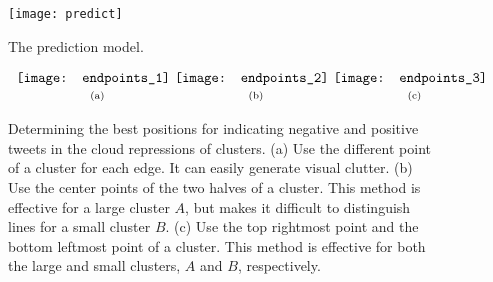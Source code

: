 
\begin{figure}[t]
\begin{center}
\texttt{[image: predict]}
\end{center}
\vspace{-.1in}
\caption{The prediction model.}
\label{fig:predict-model}
\end{figure}

\begin{figure*}[t]
\begin{center}
$\begin{array}{c@{\hspace{0.01\linewidth}}c@{\hspace{0.01\linewidth}}c}
\texttt{[image: endpoints\_1]} &
\texttt{[image: endpoints\_2]} &
\texttt{[image: endpoints\_3]}
\\
\mbox{\small{(a)}} & \mbox{\small{(b)}} & \mbox{\small{(c)}}
\end{array}$
\end{center}
\vspace{-.1in}
\caption{Determining the best positions for indicating negative and positive tweets in the cloud repressions of clusters. (a) Use the different point of a cluster for each edge. It can easily generate visual clutter. (b) Use the center points of the two halves of a cluster. This method is effective for a large cluster $A$, but makes it difficult to distinguish lines for a small cluster $B$. (c) Use the top rightmost point and  the bottom leftmost point of a cluster. This method is effective for both the large and small clusters, $A$ and $B$, respectively.}
\label{fig:corners}
\end{figure*}

